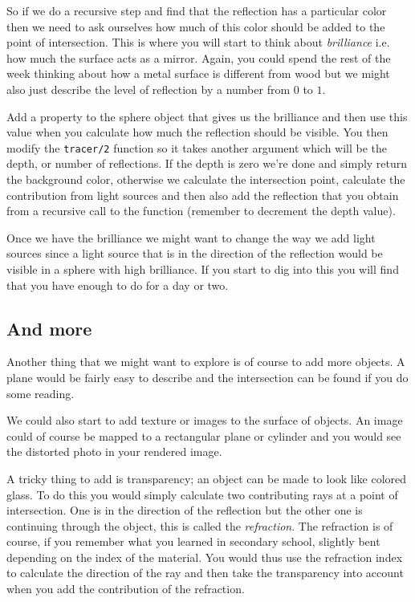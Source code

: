 \documentclass[a4paper,11pt]{article}
\begin{document}
So if we do a recursive step and find that the reflection has a
particular color then we need to ask ourselves how much of this color
should be added to the point of intersection. This is where you will
start to think about {\em brilliance} i.e. how much the surface acts as
a mirror. Again, you could spend the rest of the week thinking about
how a metal surface is different from wood but we might also just
describe the level of reflection by a number from $0$ to $1$.

Add a property to the sphere object that gives us the brilliance and
then use this value when you calculate how much the reflection should
be visible. You then modify the {\tt tracer/2} function so it takes
another argument which will be the depth, or number of reflections. If
the depth is zero we're done and simply return the background color,
otherwise we calculate the intersection point, calculate the
contribution from light sources and then also add the reflection that
you obtain from a recursive call to the function (remember to
decrement the depth value).

Once we have the brilliance we might want to change the way we add
light sources since a light source that is in the direction of the
reflection would be visible in a sphere with high brilliance. If you
start to dig into this you will find that you have enough to do for a
day or two.

\subsection*{And more}

Another thing that we might want to explore is of course to add more
objects. A plane would be fairly easy to describe and the intersection
can be found if you do some reading.

We could also start to add texture or images to the surface of
objects. An image could of course be mapped to a rectangular plane or
cylinder and you would see the distorted photo in your rendered image.

A tricky thing to add is transparency; an object can be made to
look like colored glass. To do this you would simply calculate two
contributing rays at a point of intersection. One is in the direction
of the reflection but the other one is continuing through the object,
this is called the {\em refraction}. The refraction is of course, if
you remember what you learned in secondary school, slightly bent
depending on the index of the material. You would thus use the
refraction index to calculate the direction of the ray and then take
the transparency into account when you add the contribution of the
refraction.
\end{document}
